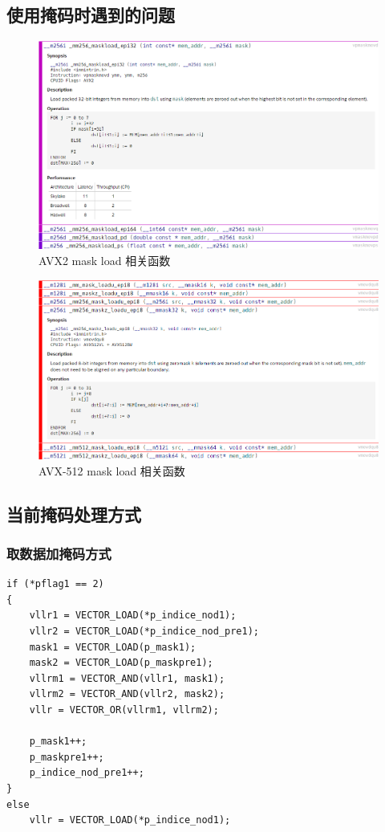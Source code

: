 \documentclass{article}
\begin{document}
\subsection{使用掩码时遇到的问题}
\begin{figure}[H]
	\centering
	\includegraphics[width = .8\textwidth]{maskload256.png}
	\caption{AVX2 mask load 相关函数}
\end{figure}
\begin{figure}[H]
	\centering
	\includegraphics[width = .8\textwidth]{maskload512.png}
	\caption{AVX-512 mask load 相关函数}
\end{figure}
\subsection{当前掩码处理方式}
\subsubsection{取数据加掩码方式}
\begin{lstlisting}
if (*pflag1 == 2)
{
	vllr1 = VECTOR_LOAD(*p_indice_nod1);
	vllr2 = VECTOR_LOAD(*p_indice_nod_pre1);
	mask1 = VECTOR_LOAD(p_mask1);
	mask2 = VECTOR_LOAD(p_maskpre1);
	vllrm1 = VECTOR_AND(vllr1, mask1);
	vllrm2 = VECTOR_AND(vllr2, mask2);
	vllr = VECTOR_OR(vllrm1, vllrm2);

	p_mask1++;
	p_maskpre1++;
	p_indice_nod_pre1++;
}
else
	vllr = VECTOR_LOAD(*p_indice_nod1);
\end{lstlisting}
\end{document}
